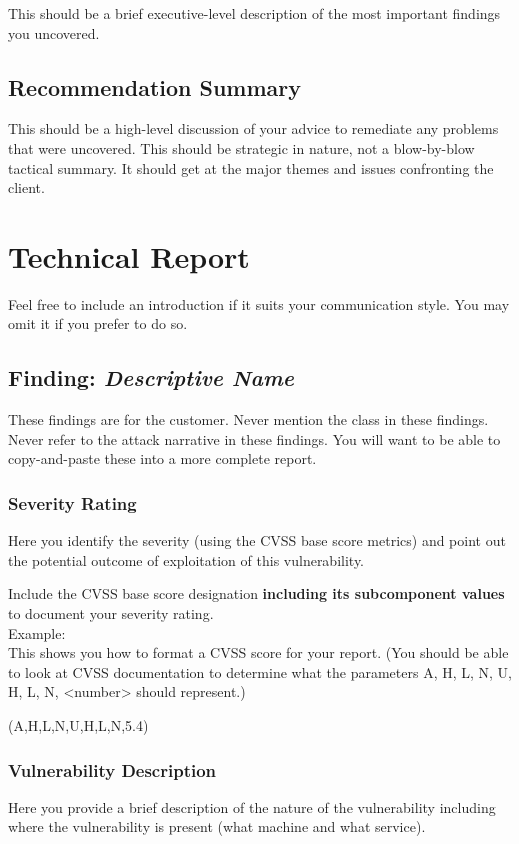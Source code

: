 \documentclass[notitlepage]{article}
\begin{document}
This should be a brief executive-level description of the most important findings you uncovered.


\subsection{Recommendation Summary}

This should be a high-level discussion of your advice to remediate any problems that were uncovered.
This should be strategic in nature, not a blow-by-blow tactical summary.
It should get at the major themes and issues confronting the client.


\section{Technical Report}

Feel free to include an introduction if it suits your communication style.
You may omit it if you prefer to do so.


  \subsection{Finding: \emph{Descriptive Name}}
  
    These findings are for the customer.
    Never mention the class in these findings.
    Never refer to the attack narrative in these findings.
    You will want to be able to copy-and-paste these into a more complete report.

	\subsubsection*{Severity Rating}
		Here you identify the severity (using the CVSS base score metrics)
		and point out the potential outcome of exploitation of this
		vulnerability.

		Include the CVSS base score designation \textbf{including its
		subcomponent values} to document your	severity rating.\\
		Example: \\
	   	This shows you how to format a CVSS score for your report.
	   	(You should be able to look at CVSS documentation to
	   	determine what the parameters A, H, L, N, U, H, L, N,
	   	<number> should represent.)
	   	
	    
		\cvss(A,H,L,N,U,H,L,N,5.4)
		
  	\subsubsection*{Vulnerability Description}
  		Here you provide a brief description of the nature of the vulnerability
  		including where the vulnerability is present (what machine and
  		what service).
  		
\end{document}
